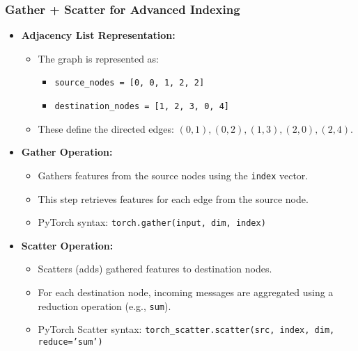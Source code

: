 \begin{notes}
\end{notes}

\subsubsection{Gather + Scatter for Advanced Indexing}
\begin{notes}
    \begin{itemize}    
        \item \textbf{Adjacency List Representation:}
        \begin{itemize}
            \item The graph is represented as:
            \begin{itemize}
                \item \texttt{source\_nodes = [0, 0, 1, 2, 2]}
                \item \texttt{destination\_nodes = [1, 2, 3, 0, 4]}
            \end{itemize}
            \item These define the directed edges: $(0,1), (0,2), (1,3), (2,0), (2,4)$.
        \end{itemize}
        \item \textbf{Gather Operation:}
        \begin{itemize}
            \item Gathers features from the source nodes using the \texttt{index} vector.
            \item This step retrieves features for each edge from the source node.
            \item PyTorch syntax: \texttt{torch.gather(input, dim, index)}
        \end{itemize}
        \item \textbf{Scatter Operation:}
        \begin{itemize}
            \item Scatters (adds) gathered features to destination nodes.
            \item For each destination node, incoming messages are aggregated using a reduction operation (e.g., \texttt{sum}).
            \item PyTorch Scatter syntax: \texttt{torch\_scatter.scatter(src, index, dim, reduce='sum')}

\end{itemize}
\end{itemize}
\end{notes}

